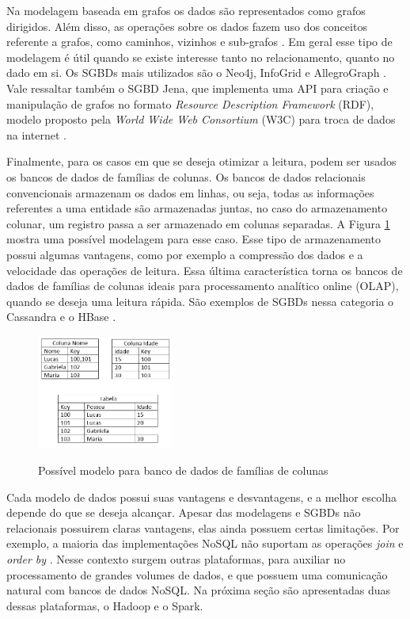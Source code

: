 Na modelagem baseada em grafos os dados são representados como grafos dirigidos. Além disso, 
as operações sobre os dados fazem uso dos conceitos referente a grafos, como caminhos, 
vizinhos e sub-grafos \cite{de2010nosql}. Em geral esse tipo de modelagem é útil 
quando se existe interesse tanto no relacionamento, quanto no dado em si. Os SGBDs mais 
utilizados são o Neo4j, InfoGrid e AllegroGraph \cite{moniruzzaman2013nosql}. Vale ressaltar 
também o SGBD Jena, que implementa uma API para criação e manipulação de grafos no formato 
\textit{Resource Description Framework} (RDF), modelo proposto pela \textit{World Wide Web 
Consortium} (W3C) para troca de dados na internet \cite{mcbride2001jena}.

Finalmente, para os casos em que se deseja otimizar a leitura, podem ser usados os bancos de 
dados de famílias de colunas. Os bancos de dados relacionais convencionais armazenam os dados 
em linhas, ou seja, todas as informações referentes a uma entidade são armazenadas juntas, 
no caso do armazenamento colunar, um registro passa a ser armazenado em colunas separadas. 
A Figura \ref{fig:db-colunar} mostra uma possível modelagem para esse caso. Esse tipo de 
armazenamento possui algumas vantagens, como por exemplo a compressão dos dados e a 
velocidade das operações de leitura. Essa última característica torna os bancos de dados de 
famílias de colunas ideais para processamento analítico online (OLAP), quando se deseja uma 
leitura rápida. São exemplos de SGBDs nessa categoria o Cassandra e o HBase \cite{de2010nosql}.

\begin{figure}[!htb]
    \centering
    \caption{Possível modelo para banco de dados de famílias de colunas}
    \includegraphics[width=0.4\textwidth]{./04-figuras/db-colunar}
    \label{fig:db-colunar}
\end{figure}


Cada modelo de dados possui suas vantagens e desvantagens, e a melhor escolha depende do que 
se deseja alcançar. Apesar das modelagens e SGBDs não relacionais possuirem claras vantagens,  
elas ainda possuem certas limitações. Por exemplo, a maioria das implementações NoSQL não
suportam as operações \textit{join} e \textit{order by} \cite{pokorny2013nosql}. 
Nesse contexto surgem outras plataformas, para auxiliar no processamento de grandes volumes 
de dados, e que possuem uma comunicação natural com bancos de dados NoSQL. Na próxima seção 
são apresentadas duas dessas plataformas, o Hadoop e o Spark.

